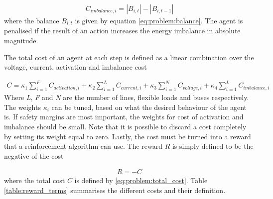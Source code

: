 \documentclass[class=book, crop=false]{standalone}
\begin{document}
\begin{equation}
   \begin{aligned}
   \label{eq:problem:balance_cost}
    C_{imbalance,i} = |B_{i,t}| - |B_{i,t-1}|
    \end{aligned} 
\end{equation}
where the balance $B_{i,t}$ is given by equation \eqref{eq:problem:balance}. The agent is penalised if the result of an action increases the energy imbalance in absolute magnitude.  

The total cost of an agent at each step is defined as a linear combination over the voltage, current, activation and imbalance cost 

\begin{equation}
   \begin{aligned}
   \label{eq:problem:total_cost}
    C = 
    \kappa_{1} \sum_{i=1}^{F}C_{activation,i} + 
    \kappa_{2} \sum_{i=1}^{L}C_{current,i} +
    \kappa_{3} \sum_{i=1}^{N}C_{voltage,i} +
    \kappa_{4} \sum_{i=1}^{L}C_{imbalance,i} 
    \end{aligned} 
\end{equation}
Where \textit{L}, \textit{F} and \textit{N} are the number of lines, flexible loads and buses respectively. The weights $\kappa_{i}$ can be tuned, based on what the desired behaviour of the agent is. If safety margins are most important, the weights for cost of activation and imbalance should be small. Note that it is possible to discard a cost completely by setting its weight equal to zero. Lastly, the cost must be turned into a reward that a reinforcement algorithm can use. The reward $R$ is simply defined to be the negative of the cost

\begin{equation}
   \begin{aligned}
   \label{eq:problem:total_reward}
    R = - C
    \end{aligned} 
\end{equation}
where the total cost $C$ is defined by \eqref{eq:problem:total_cost}. Table \ref{table:reward_terms} summarises the different costs and their definition. 
\end{document}

